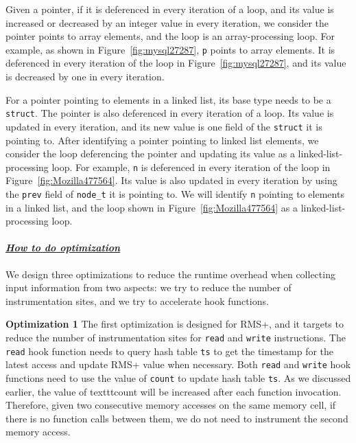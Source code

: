 Given a pointer, 
if it is deferenced in every iteration of a loop, 
and its value is increased or decreased by an integer value in every iteration,
we consider the pointer points to array elements, 
and the loop is an array-processing loop. 
For example, as shown in Figure~\ref{fig:mysql27287}, 
\texttt{p} points to array elements. 
It is deferenced in every iteration of the loop in Figure~\ref{fig:mysql27287},
and its value is decreased by one in every iteration. 

For a pointer pointing to elements in a linked list,
its base type needs to be a \texttt{struct}. 
The pointer is also deferenced in every iteration of a loop.
Its value is updated in every iteration, 
and its new value is one field of the \texttt{struct} it is pointing to. 
After identifying a pointer pointing to linked list elements,
we consider the loop deferencing the pointer and updating its value as 
a linked-list-processing loop. 
For example, \texttt{n} is deferenced in every iteration of the loop
in Figure~\ref{fig:Mozilla477564}. 
Its value is also updated in every iteration by 
using the \texttt{prev} field of \texttt{node\_t} it is pointing to. 
We will identify \texttt{n} pointing to elements in a linked list,
and the loop shown in Figure~\ref{fig:Mozilla477564} as a linked-list-processing loop.

\paragraph{\textit{\underline{How to do optimization}}}
We design three optimizations to reduce the runtime overhead when collecting input information
from two aspects:
we try to reduce the number of instrumentation sites, 
and we try to accelerate hook functions. 


\noindent\textbf{Optimization 1}
The first optimization is designed for RMS+,
and it targets to reduce the number of instrumentation sites 
for \texttt{read} and \texttt{write} instructions. 
The \texttt{read} hook function needs to query hash table \texttt{ts} 
to get the timestamp for the latest access and update RMS+ value when necessary. 
Both \texttt{read} and \texttt{write} hook functions 
need to use the value of \texttt{count} to update hash table \texttt{ts}.
As we discussed earlier, the value of texttt{count} will be increased 
after each function invocation. 
Therefore, given two consecutive memory accesses on the same memory cell,
if there is no function calls between them, 
we do not need to instrument the second memory access. 

